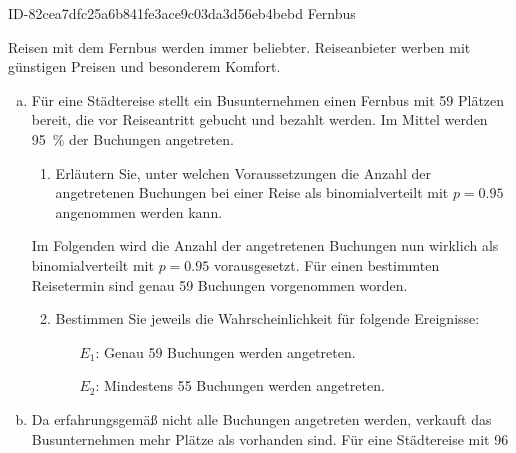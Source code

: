 \begin{exercise}
      {ID-82cea7dfc25a6b841fe3ace9c03da3d56eb4bebd}
      {Fernbus}
  \ifproblem\problem\par
    Reisen mit dem Fernbus werden immer beliebter.
    Reiseanbieter werben mit günstigen Preisen
    und besonderem Komfort.
    \begin{enumerate}[a)]
      \item Für eine Städtereise stellt ein
            Busunternehmen einen Fernbus mit
            \num{59} Plätzen bereit, die vor
            Reiseantritt gebucht und bezahlt
            werden. Im Mittel werden
            \SI{95}{\percent} der Buchungen
            angetreten.
            \begin{enumerate}[(1)]
              \item Erläutern Sie, unter welchen
                    Voraussetzungen die Anzahl
                    der angetretenen Buchungen
                    bei einer Reise als
                    binomialverteilt mit
                    $p=\num{0.95}$ angenommen
                    werden kann.
            \end{enumerate}
            Im Folgenden wird die Anzahl der
            angetretenen Buchungen nun wirklich als
            binomialverteilt mit $p=\num{0.95}$
            vorausgesetzt. Für einen bestimmten
            Reisetermin sind genau \num{59}
            Buchungen vorgenommen worden.
            \begin{enumerate}[(1)]
              \setcounter{enumii}{1}%
              \item Bestimmen Sie jeweils die
                    Wahrscheinlichkeit für folgende
                    Ereignisse:
                    \begin{itemize}
                      \item[$E_1$:]
                        Genau \num{59} Buchungen
                        werden angetreten.
                      \item[$E_2$:]
                        Mindestens \num{55}
                        Buchungen werden angetreten.
                    \end{itemize}
            \end{enumerate}
      \item Da erfahrungsgemäß nicht alle Buchungen
            angetreten werden, verkauft das
            Busunternehmen mehr Plätze als vorhanden
            sind. Für eine Städtereise mit \num{96}

\end{enumerate}
\end{exercise}
